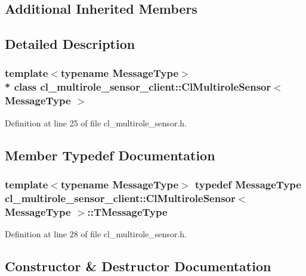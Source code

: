 \subsection*{Additional Inherited Members}


\subsection{Detailed Description}
\subsubsection*{template$<$typename Message\+Type$>$\\*
class cl\+\_\+multirole\+\_\+sensor\+\_\+client\+::\+Cl\+Multirole\+Sensor$<$ Message\+Type $>$}



Definition at line 25 of file cl\+\_\+multirole\+\_\+sensor.\+h.



\subsection{Member Typedef Documentation}
\subsubsection[{\texorpdfstring{T\+Message\+Type}{TMessageType}}]{\setlength{\rightskip}{0pt plus 5cm}template$<$typename Message\+Type$>$ typedef Message\+Type {\bf cl\+\_\+multirole\+\_\+sensor\+\_\+client\+::\+Cl\+Multirole\+Sensor}$<$ Message\+Type $>$\+::{\bf T\+Message\+Type}}\hypertarget{classcl__multirole__sensor__client_1_1ClMultiroleSensor_af8a43717b7334dec5c2857107203794f}{}\label{classcl__multirole__sensor__client_1_1ClMultiroleSensor_af8a43717b7334dec5c2857107203794f}


Definition at line 28 of file cl\+\_\+multirole\+\_\+sensor.\+h.



\subsection{Constructor \& Destructor Documentation}
